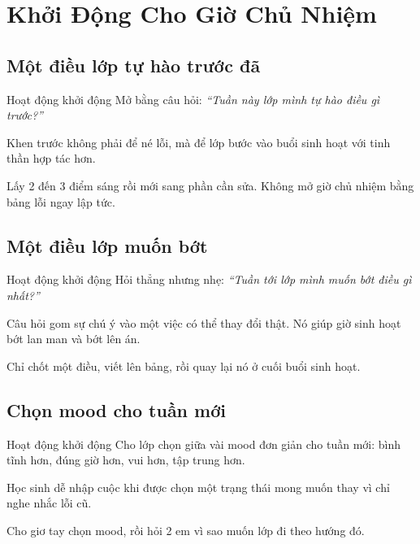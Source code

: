 \chapter{Khởi Động Cho Giờ Chủ Nhiệm}

\section{Một điều lớp tự hào trước đã}
\begin{khoidongbox}{Hoạt động khởi động}
Mở bằng câu hỏi: \textit{``Tuần này lớp mình tự hào điều gì trước?''}
\end{khoidongbox}
\begin{visaohieuqua}
Khen trước không phải để né lỗi, mà để lớp bước vào buổi sinh hoạt với tinh thần hợp tác hơn.
\end{visaohieuqua}
\begin{cachlam5phut}
Lấy 2 đến 3 điểm sáng rồi mới sang phần cần sửa. Không mở giờ chủ nhiệm bằng bảng lỗi ngay lập tức.
\end{cachlam5phut}
\ngancach

\section{Một điều lớp muốn bớt}
\begin{khoidongbox}{Hoạt động khởi động}
Hỏi thẳng nhưng nhẹ: \textit{``Tuần tới lớp mình muốn bớt điều gì nhất?''}
\end{khoidongbox}
\begin{visaohieuqua}
Câu hỏi gom sự chú ý vào một việc có thể thay đổi thật. Nó giúp giờ sinh hoạt bớt lan man và bớt lên án.
\end{visaohieuqua}
\begin{cachlam5phut}
Chỉ chốt một điều, viết lên bảng, rồi quay lại nó ở cuối buổi sinh hoạt.
\end{cachlam5phut}
\ngancach

\section{Chọn mood cho tuần mới}
\begin{khoidongbox}{Hoạt động khởi động}
Cho lớp chọn giữa vài mood đơn giản cho tuần mới: bình tĩnh hơn, đúng giờ hơn, vui hơn, tập trung hơn.
\end{khoidongbox}
\begin{visaohieuqua}
Học sinh dễ nhập cuộc khi được chọn một trạng thái mong muốn thay vì chỉ nghe nhắc lỗi cũ.
\end{visaohieuqua}
\begin{cachlam5phut}
Cho giơ tay chọn mood, rồi hỏi 2 em vì sao muốn lớp đi theo hướng đó.
\end{cachlam5phut}
\ngancach

